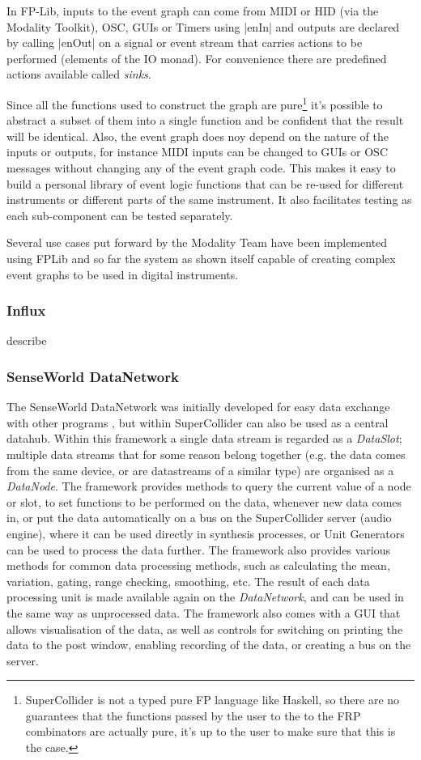 \documentclass{article}
\begin{document}
In FP-Lib, inputs to the event graph can come from MIDI or HID (via the Modality Toolkit), OSC, GUIs or Timers using |enIn| and outputs are declared by calling |enOut| on a signal or event stream that carries actions to be performed (elements of the IO monad). For convenience there are predefined actions available called \textit{sinks}.

Since all the functions used to construct the graph are pure\footnote{SuperCollider is not a typed pure FP language like Haskell, so there are no guarantees that the functions passed by the user to the to the FRP combinators are actually pure, it's up to the user to make sure that this is the case.} it's possible to abstract a subset of them into a single function and be confident that the result will be identical. Also, the event graph does noy depend on the nature of the inputs or outputs, for instance MIDI inputs can be changed to GUIs or OSC messages without changing any of the event graph code. This makes it easy to build a personal library of event logic functions that can be re-used for different instruments or different parts of the same instrument. It also facilitates testing as each sub-component can be tested separately.

Several use cases put forward by the Modality Team have been implemented using FPLib and so far the system as shown itself capable of creating complex event graphs to be used in digital instruments.


\subsubsection{Influx}
\label{sub:influx}

describe


\subsubsection{SenseWorld DataNetwork}

The SenseWorld DataNetwork was initially developed for easy data exchange with other programs \cite{Baalman2010}, but within SuperCollider can also be used as a central datahub. Within this framework a single data stream is regarded as a \emph{DataSlot}; multiple data streams that for some reason belong together (e.g. the data comes from the same device, or are datastreams of a similar type) are organised as a \emph{DataNode}. The framework provides methods to query the current value of a node or slot, to set functions to be performed on the data, whenever new data comes in, or put the data automatically on a bus on the SuperCollider server (audio engine), where it can be used directly in synthesis processes, or Unit Generators can be used to process the data further.
The framework also provides various methods for common data processing methods, such as calculating the mean, variation, gating, range checking, smoothing, etc. The result of each data processing unit is made available again on the \emph{DataNetwork}, and can be used in the same way as unprocessed data. The framework also comes with a GUI that allows visualisation of the data, as well as controls for switching on printing the data to the post window, enabling recording of the data, or creating a bus on the server.
\end{document}
